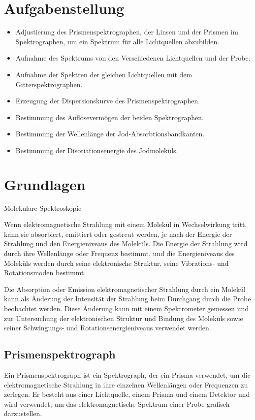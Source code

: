 \documentclass[12pt,english,ngerman]{scrartcl}
\begin{document}
\section{Aufgabenstellung\label{sec:Aufgabenstellung}}

\begin{itemize}
	\item Adjustierung des Prismenspektrographen, der Linsen und der Prismen im Spektrographen, um ein Spektrum für alle 
	Lichtquellen abzubilden.
	\item Aufnahme des Spektrums von den Verschiedenen Lichtquellen und der Probe.
	\item Aufnahme der Spektren der gleichen Lichtquellen mit dem Gitterspektrographen.
	\item Erzeugung der Dispersionskurve des Prismenspektrographen.
	\item Bestimmung des Auflösevermögen der beiden Spektrographen.
	\item Bestimmung der Wellenlänge der Jod-Absorbtionsbandkanten.
	\item Bestimmung der Disotiationsenergie des Jodmoleküls.
\end{itemize}

\section{Grundlagen}\label{sec:Grund}


Molekulare Spektroskopie

Wenn elektromagnetische Strahlung mit einem Molekül in Wechselwirkung tritt, kann sie absorbiert, emittiert oder 
gestreut werden, je nach der Energie der Strahlung und den Energieniveaus des Moleküls. Die Energie der Strahlung 
wird durch ihre Wellenlänge oder Frequenz bestimmt, und die Energieniveaus des Moleküls werden durch seine elektronische 
Struktur, seine Vibrations- und Rotationsmoden bestimmt.

Die Absorption oder Emission elektromagnetischer Strahlung durch ein Molekül kann als Änderung der Intensität der 
Strahlung beim Durchgang durch die Probe beobachtet werden. Diese Änderung kann mit einem Spektrometer gemessen und
 zur Untersuchung der elektronischen Struktur und Bindung des Moleküls sowie seiner Schwingungs- und Rotationsenergieniveaus
  verwendet werden.

\subsection{Prismenspektrograph}
Ein Prismenspektrograph ist ein Spektrograph, der ein Prisma verwendet, um die elektromagnetische Strahlung in ihre 
einzelnen Wellenlängen oder Frequenzen zu zerlegen. Er besteht aus einer Lichtquelle, einem Prisma und einem Detektor 
und wird verwendet, um das elektromagnetische Spektrum einer Probe grafisch darzustellen.
\end{document}
